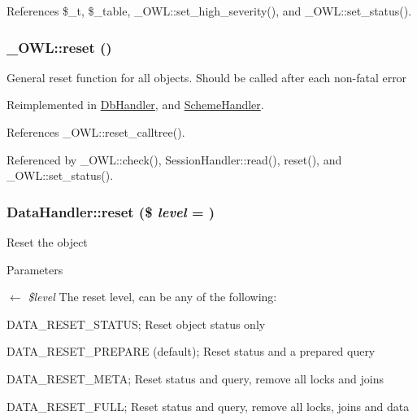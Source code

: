 References \$\_\-t, \$\_\-table, \_\-OWL::set\_\-high\_\-severity(), and \_\-OWL::set\_\-status().

\subsubsection[{reset}]{\setlength{\rightskip}{0pt plus 5cm}\_\-OWL::reset ()}\label{class__OWL_a2f2a042bcf31965194c03033df0edc9b}
General reset function for all objects. Should be called after each non-\/fatal error 

Reimplemented in \hyperlink{classDbHandler_a9982df4830f05803935bb31bac7fae3d}{DbHandler}, and \hyperlink{classSchemeHandler_aa25feb4a70d67b3d571904be4b2f50bc}{SchemeHandler}.



References \_\-OWL::reset\_\-calltree().



Referenced by \_\-OWL::check(), SessionHandler::read(), reset(), and \_\-OWL::set\_\-status().

\subsubsection[{reset}]{\setlength{\rightskip}{0pt plus 5cm}DataHandler::reset (\$ {\em level} = {})}\label{classDataHandler_ab89e1aaad9cd0a37f1c7f13c1d9c0d57}
Reset the object 
\begin{DoxyParams}{Parameters}
\item[\mbox{$\leftarrow$} {\em \$level}]The reset level, can be any of the following:
\begin{DoxyItemize}
\item DATA\_\-RESET\_\-STATUS; Reset object status only
\item DATA\_\-RESET\_\-PREPARE (default); Reset status and a prepared query
\item DATA\_\-RESET\_\-META; Reset status and query, remove all locks and joins
\item DATA\_\-RESET\_\-FULL; Reset status and query, remove all locks, joins and data 
\end{DoxyItemize}\end{DoxyParams}


